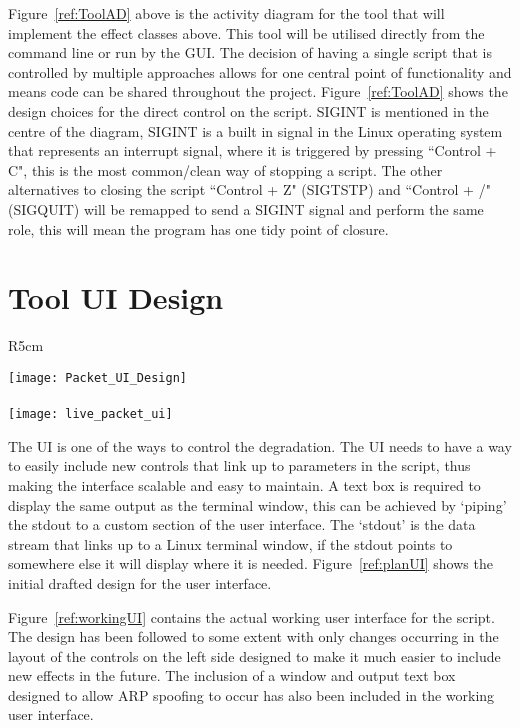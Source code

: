 Figure~\ref{ref:ToolAD} above is the activity diagram for the tool that will implement the effect classes above. This tool will be utilised directly from the command line or run by the GUI. The decision of having a single script that is controlled by multiple approaches allows for one central point of functionality and means code can be shared throughout the project. Figure~\ref{ref:ToolAD} shows the design choices for the direct control on the script. SIGINT is mentioned in the centre of the diagram, SIGINT is a built in signal in the Linux operating system that represents an interrupt signal, where it is triggered by pressing ``Control + C", this is the most common/clean way of stopping a script. The other alternatives to closing the script ``Control + Z" (SIGTSTP) and ``Control + /" (SIGQUIT) will be remapped to send a SIGINT signal and perform the same role, this will mean the program has one tidy point of closure.

%
\section{Tool UI Design}
\begin{wrapfigure}{R}{5cm}
\begin{center}
	\texttt{[image: Packet\_UI\_Design]}
	\caption{Initial user interface design for the Degradation GUI}
	\label{ref:planUI}
	\paragraph{}
	\texttt{[image: live\_packet\_ui]}
	\caption{Actual working Packet user interface}
	\label{ref:workingUI}
\end{center}	
\end{wrapfigure}

The UI is one of the ways to control the degradation. The UI needs to have a way to easily include new controls that link up to parameters in the script, thus making the interface scalable and easy to maintain. A text box is required to display the same output as the terminal window, this can be achieved by `piping' the stdout to a custom section of the user interface. The `stdout' is the data stream that links up to a Linux terminal window, if the stdout points to somewhere else it will display where it is needed. Figure~\ref{ref:planUI} shows the initial drafted design for the user interface.

Figure~\ref{ref:workingUI} contains the actual working user interface for the script. The design has been followed to some extent with only changes occurring in the layout of the controls on the left side designed to make it much easier to include new effects in the future. The inclusion of a window and output text box designed to allow ARP spoofing to occur has also been included in the working user interface.


